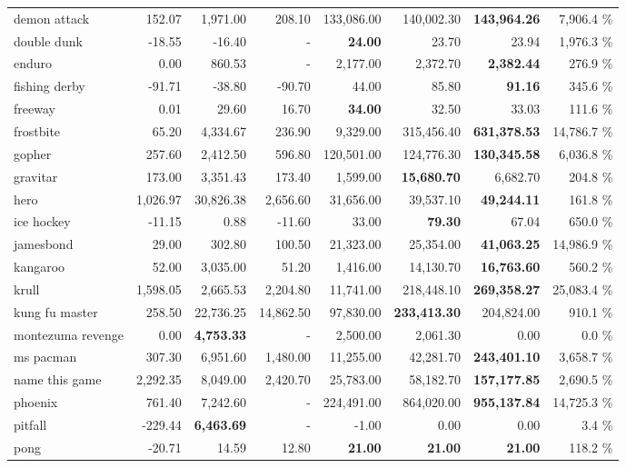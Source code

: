 \begin{center}
\begin{tabularx}{0.900000\textwidth}{X| r r r r r r r}
demon attack &152.07 & 1,971.00 & 208.10 & 133,086.00 & 140,002.30 & \textbf{143,964.26} & 7,906.4 \%\\
double dunk &-18.55 & -16.40 & - & \textbf{24.00} & 23.70 & 23.94 & 1,976.3 \%\\
enduro &0.00 & 860.53 & - & 2,177.00 & 2,372.70 & \textbf{2,382.44} & 276.9 \%\\
fishing derby &-91.71 & -38.80 & -90.70 & 44.00 & 85.80 & \textbf{91.16} & 345.6 \%\\
freeway &0.01 & 29.60 & 16.70 & \textbf{34.00} & 32.50 & 33.03 & 111.6 \%\\
frostbite &65.20 & 4,334.67 & 236.90 & 9,329.00 & 315,456.40 & \textbf{631,378.53} & 14,786.7 \%\\
gopher &257.60 & 2,412.50 & 596.80 & 120,501.00 & 124,776.30 & \textbf{130,345.58} & 6,036.8 \%\\
gravitar &173.00 & 3,351.43 & 173.40 & 1,599.00 & \textbf{15,680.70} & 6,682.70 & 204.8 \%\\
hero &1,026.97 & 30,826.38 & 2,656.60 & 31,656.00 & 39,537.10 & \textbf{49,244.11} & 161.8 \%\\
ice hockey &-11.15 & 0.88 & -11.60 & 33.00 & \textbf{79.30} & 67.04 & 650.0 \%\\
jamesbond &29.00 & 302.80 & 100.50 & 21,323.00 & 25,354.00 & \textbf{41,063.25} & 14,986.9 \%\\
kangaroo &52.00 & 3,035.00 & 51.20 & 1,416.00 & 14,130.70 & \textbf{16,763.60} & 560.2 \%\\
krull &1,598.05 & 2,665.53 & 2,204.80 & 11,741.00 & 218,448.10 & \textbf{269,358.27} & 25,083.4 \%\\
kung fu master &258.50 & 22,736.25 & 14,862.50 & 97,830.00 & \textbf{233,413.30} & 204,824.00 & 910.1 \%\\
montezuma revenge &0.00 & \textbf{4,753.33} & - & 2,500.00 & 2,061.30 & 0.00 & 0.0 \%\\
ms pacman &307.30 & 6,951.60 & 1,480.00 & 11,255.00 & 42,281.70 & \textbf{243,401.10} & 3,658.7 \%\\
name this game &2,292.35 & 8,049.00 & 2,420.70 & 25,783.00 & 58,182.70 & \textbf{157,177.85} & 2,690.5 \%\\
phoenix &761.40 & 7,242.60 & - & 224,491.00 & 864,020.00 & \textbf{955,137.84} & 14,725.3 \%\\
pitfall &-229.44 & \textbf{6,463.69} & - & -1.00 & 0.00 & 0.00 & 3.4 \%\\
pong &-20.71 & 14.59 & 12.80 & \textbf{21.00} & \textbf{21.00} & \textbf{21.00} & 118.2 \%\\

\end{tabularx}
\end{center}
